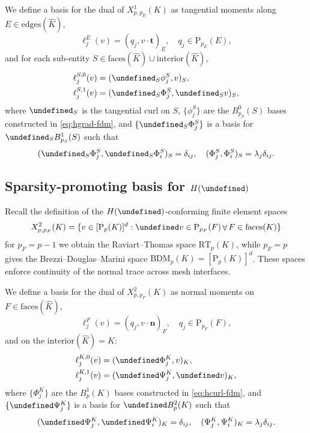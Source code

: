 \documentclass[review,onefignum,onetabnum,a4paper]{siamart190516}
\let\grad\undefined
\let\curl\undefined
\let\div\undefined
\let\tr\undefined
\DeclareMathOperator{\grad}{grad}
\DeclareMathOperator{\curl}{curl}
\DeclareMathOperator{\div}{div}
\DeclareMathOperator{\tr}{tr}
\DeclareMathOperator{\Forall}{\forall}
\newcommand{\Hdiv}{H(\div)}
\renewcommand{\vec}[1]{\mathbf{#1}}
\newcommand{\bn}{\vec{n}}
\newcommand{\bt}{\vec{t}}
\newcommand{\Khat}{\hat{K}}
\renewcommand{\P}{\mathrm{P}}
\newcommand{\RT}{\mathrm{RT}}
\newcommand{\BDM}{\mathrm{BDM}}
\begin{document}
We define a basis for the dual of $X^1_{p, p_E}(K)$ as 
tangential moments along $E\in \text{edges}(\Khat)$,
\begin{equation}
   \ell^E_j(v) = (q_j, v\cdot \bt)_E, \quad q_j \in \P_{p_E}(E), 
\end{equation}
and for each sub-entity $S \in \text{faces}(\Khat) \cup \text{interior}(\Khat)$,
\begin{align}
   \ell^{S,0}_j(v) &= (\grad_S\phi^S_j, v)_{S}, \\
   \ell^{S,1}_j(v) &= (\curl_S\Phi^S_j, \curl_S v)_{S}, \label{eq:hcurl-interior-dofs}
\end{align}
where $\curl_S$ is the tangential curl on $S$,
$\{\phi^S_j\}$ are the $B^0_{p_S}(S)$ bases constructed in \eqref{eq:hgrad-fdm},
and $\{\curl_S\Phi^S_j\}$ is a basis for $\curl_S B^1_{p_S}(S)$
such that
\begin{equation} \label{eq:hcurl-fdm}
   (\curl_S\Phi^S_j, \curl_S\Phi^S_i)_{S} = \delta_{ij}, \quad
   (\Phi^S_j, \Phi^S_i)_{S} = \lambda_j\delta_{ij}.
\end{equation}


\subsection{Sparsity-promoting basis for $\Hdiv$}

Recall the definition of the $\Hdiv$-conforming finite element spaces
\begin{equation}
   X^2_{p, p_F}(K) = \{v\in [\P_p(K)]^d : \tr v \in \P_{p_F}(F) \Forall F \in \text{faces}(K)  \}
\end{equation}
for $p_F=p-1$ we obtain the Raviart--Thomas space $\RT_p(K)$, while
$p_F=p$ gives the Brezzi--Douglas--Marini space $\BDM_p(K) = [\P_p(K)]^d$. 
These spaces enforce continuity of the normal trace across mesh interfaces.

We define a basis for the dual of $X^2_{p, p_F}(K)$ as normal moments on $F\in
\text{faces}(\Khat)$,
\begin{equation}
   \ell^F_j(v) = (q_j, v\cdot \bn)_F, \quad q_j \in \P_{p_F}(F),
\end{equation}
and on the $\text{interior}(\Khat) = K$: 
\begin{align}
   \ell^{K,0}_j(v) &= (\curl\Phi^K_j, v)_{K}, \\
   \ell^{K,1}_j(v) &= (\div\Psi^K_j, \div v)_{K}, \label{eq:hdiv-interior-dofs}
\end{align}
where $\{\Phi^K_j\}$ are the $B^1_p(K)$ bases constructed in
\eqref{eq:hcurl-fdm}, and $\{\div\Psi^K_j\}$ is a basis for $\div B^2_p(K)$ such that
\begin{equation} \label{eq:hdiv-fdm}
   (\div\Psi^K_j, \div\Psi^K_i)_K = \delta_{ij}, \quad
   (\Psi^K_j, \Psi^K_i)_{K} = \lambda_j\delta_{ij}.
\end{equation}
\end{document}
